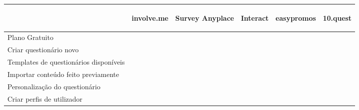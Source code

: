 	
\renewcommand{\arraystretch}{2}
\setlength\arrayrulewidth{1pt}
\begin{table}[!ht]  
	\begin{center}
		\begin{tabular}{|p{3cm}|p{0cm}|p{0cm}|p{0cm}|p{0cm}|p{0cm}|}
			\cline{2-6}
			\multicolumn{1}{c|}{} & \hspace{0.2cm}\begin{sideways}involve.me\end{sideways} & \hspace{0.4cm}\begin{sideways}Survey Anyplace\end{sideways} & \hspace{0.2cm}\begin{sideways}Interact\end{sideways}&
			\hspace{0.2cm}\begin{sideways}easypromos\end{sideways}& \hspace{0.2cm}\begin{sideways} 10.quest\end{sideways}\\ \hline
			
			
			Plano Gratuito & \cellcolor{yellow!80}   & \cellcolor{red!80}  & \cellcolor{red!80} & \cellcolor{yellow!80} & \cellcolor{yellow!80} \\ \hline
			
			Criar questionário novo & \cellcolor{green!80}  & \cellcolor{green!80}  & \cellcolor{green!80} & \cellcolor{green!80}  &\cellcolor{green!80} \\ \hline
			
			Templates de questionários disponíveis& \cellcolor{green!80}  & \cellcolor{green!80} & \cellcolor{green!80} & \cellcolor{green!80}  & \cellcolor{red!80}  \\ \hline		
			
			Importar conteúdo feito previamente & \cellcolor{red!80}   & \cellcolor{red!80}  & \cellcolor{red!80} & \cellcolor{red!80} & \cellcolor{green!80}  \\ \hline
			
			Personalização do questionário & \cellcolor{green!80}  & \cellcolor{green!80}  & \cellcolor{green!80} & \cellcolor{green!80} & \cellcolor{green!80} \\ \hline
			
			Criar perfis de utilizador & \cellcolor{red!80}   & \cellcolor{red!80}  & \cellcolor{red!80} & \cellcolor{red!80} & \cellcolor{green!80}  \\ \hline
			

\end{tabular}
\end{center}
\end{table}
